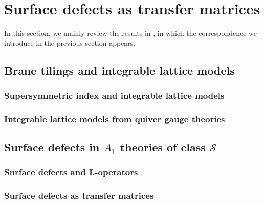 




\section{Surface defects as transfer matrices}

In this section, we mainly review the results in \cite{Maruyoshi:2016caf}, in which the correspondence we introduce in the previous section appears. 







\subsection{Brane tilings and integrable lattice models}









\subsubsection{Supersymmetric index and integrable lattice models}








\subsubsection{Integrable lattice models from quiver gauge theories}








\subsection{Surface defects in $A_1$ theories of class $\mathcal S$}








\subsubsection{Surface defects and L-operators}









\subsubsection{Surface defects as transfer matrices}












